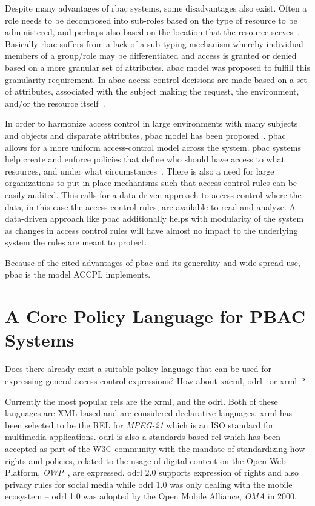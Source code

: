 Despite many advantages of \ac{rbac} systems, some disadvantages also exist. Often a role needs to be decomposed into sub-roles based on the type of resource to be administered, and perhaps also based on the location that the resource serves~\cite{nist}. Basically \ac{rbac} suffers from a lack of a sub-typing mechanism whereby individual members of a group/role may be differentiated and access is granted or denied based on a more granular set of attributes. \ac{abac} model was proposed to fulfill this granularity requirement. In \ac{abac} access control decisions are made based on a set of attributes, associated with the subject making the request, the environment, and/or the resource itself~\cite{nist}. 

In order to harmonize access control in large environments with many subjects and objects and disparate attributes, \ac{pbac} model has been proposed~\cite{nist}. \ac{pbac} allows for a more uniform access-control model across the system. \ac{pbac} systems help create and enforce policies
that define who should have access to what resources, and under what circumstances~\cite{nist}.
There is also a need for large organizations to put in place mechanisms such that access-control rules can be easily audited. This calls for a data-driven approach to access-control where the data, in this case the access-control rules, are available to read and analyze. A data-driven approach like \ac{pbac} additionally helps with modularity of the system as changes in access control rules will have almost no impact to the underlying system the rules are meant to protect.

Because of the cited advantages of \ac{pbac} and its generality and wide spread use, \ac{pbac} is the model \ac{ACCPL} implements.

\section{A Core Policy Language for PBAC Systems} 

Does there already exist a suitable policy language that can be used for expressing general access-control expressions? How about \ac{xacml}, \ac{odrl}\newline~\cite{odrloneone} or \ac{xrml}~\cite{Wang}? 

Currently the most popular \ac{rel}s are the \ac{xrml}, and the \ac{odrl}. Both of these languages are XML based and are considered declarative languages. \ac{xrml} has been selected to be the REL for \emph{MPEG-21} which is an ISO standard for multimedia applications. \ac{odrl} is also a standards based \ac{rel} which has been accepted as part of the W3C community with the mandate of standardizing how rights and policies, related to the usage of digital content on the Open Web Platform, \emph{OWP}~\cite{openwebplatform}, are expressed. \ac{odrl} 2.0 supports expression of rights and also privacy rules for social media while \ac{odrl} 1.0 was only dealing with the mobile ecosystem -- \ac{odrl} 1.0 was adopted by the Open Mobile Alliance, \emph{OMA} in 2000.

